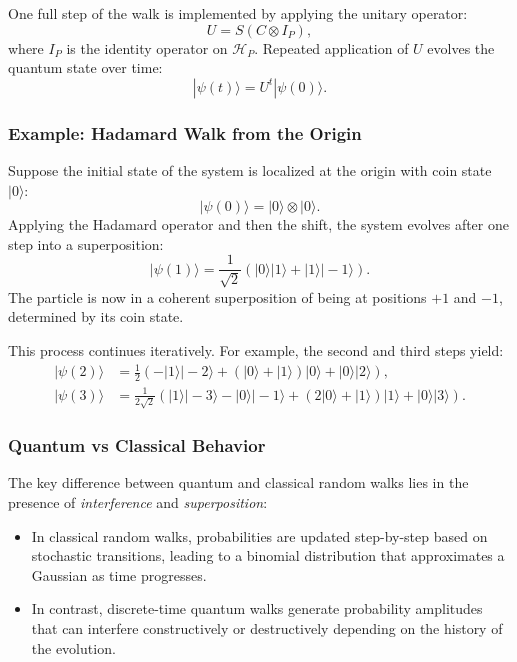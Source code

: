 \documentclass[11pt]{article}
\theoremstyle{definition}
\begin{document}
One full step of the walk is implemented by applying the unitary operator:
\[
U = S (C \otimes I_P),
\]
where \( I_P \) is the identity operator on \( \mathcal{H}_P \). Repeated application of \( U \) evolves the quantum state over time:
\[
|\psi(t)\rangle = U^t |\psi(0)\rangle.
\]

\subsubsection*{Example: Hadamard Walk from the Origin}

Suppose the initial state of the system is localized at the origin with coin state \( |0\rangle \):
\[
|\psi(0)\rangle = |0\rangle \otimes |0\rangle.
\]
Applying the Hadamard operator and then the shift, the system evolves after one step into a superposition:
\[
|\psi(1)\rangle = \frac{1}{\sqrt{2}} \left( |0\rangle|1\rangle + |1\rangle|-1\rangle \right).
\]
The particle is now in a coherent superposition of being at positions \( +1 \) and \( -1 \), determined by its coin state.

This process continues iteratively. For example, the second and third steps yield:
\begin{align*}
|\psi(2)\rangle &= \frac{1}{2} \left( -|1\rangle|-2\rangle + (|0\rangle + |1\rangle)|0\rangle + |0\rangle|2\rangle \right), \\
|\psi(3)\rangle &= \frac{1}{2\sqrt{2}} \left( |1\rangle|-3\rangle - |0\rangle|-1\rangle + (2|0\rangle + |1\rangle)|1\rangle + |0\rangle|3\rangle \right).
\end{align*}

\subsubsection*{Quantum vs Classical Behavior}

The key difference between quantum and classical random walks lies in the presence of \textit{interference} and \textit{superposition}:
\begin{itemize}
    \item In classical random walks, probabilities are updated step-by-step based on stochastic transitions, leading to a binomial distribution that approximates a Gaussian as time progresses.
    \item In contrast, discrete-time quantum walks generate probability amplitudes that can interfere constructively or destructively depending on the history of the evolution.
\end{itemize}
\end{document}
